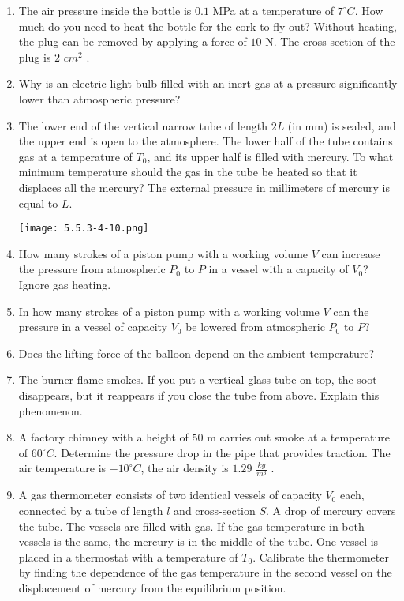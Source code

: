 \documentclass{article}
\begin{document}
\begin{enumerate}[label=5.5.\arabic*]
\item The air pressure inside the bottle is $0.1$ MPa at a temperature of $7^\circ C$. How much do you need to heat the bottle for the cork to fly out? Without heating, the plug can be removed by applying a force of $10$ N. The cross-section of the plug is $2$ $cm^2$ .

\item Why is an electric light bulb filled with an inert gas at a pressure significantly lower than atmospheric pressure?

\item The lower end of the vertical narrow tube of length $2L$ (in mm) is sealed, and the upper end is open to the atmosphere. The lower half of the tube contains gas at a temperature of $T_0$, and its upper half is filled with mercury. To what minimum temperature should the gas in the tube be heated so that it displaces all the mercury? The external pressure in millimeters of mercury is equal to $L$. 

\begin{center}
    \texttt{[image: 5.5.3-4-10.png]}
\end{center}


\item How many strokes of a piston pump with a working volume $V$ can increase the pressure from atmospheric $P_0$ to $P$ in a vessel with a capacity of $V_0$? Ignore gas heating.

\item In how many strokes of a piston pump with a working volume $V$ can the pressure in a vessel of capacity $V_0$ be lowered from atmospheric $P_0$ to $P$?

\item Does the lifting force of the balloon depend on the ambient temperature?

\item The burner flame smokes. If you put a vertical glass tube on top, the soot disappears, but it reappears if you close the tube from above. Explain this phenomenon.

\item A factory chimney with a height of $50$ m carries out smoke at a temperature of $60^\circ C$. Determine the pressure drop in the pipe that provides traction. The air temperature is $-10^\circ C$, the air density is $1.29$ $\frac{kg}{m^3}$ .

\item A gas thermometer consists of two identical vessels of capacity $V_0$ each, connected by a tube of length $l$ and cross-section $S$. A drop of mercury covers the tube. The vessels are filled with gas. If the gas temperature in both vessels is the same, the mercury is in the middle of the tube. One vessel is placed in a thermostat with a temperature of $T_0$. Calibrate the thermometer by finding the dependence of the gas temperature in the second vessel on the displacement of mercury from the equilibrium position.


\end{enumerate}
\end{document}

